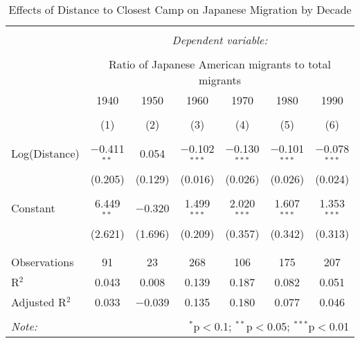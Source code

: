 
\begin{table}[!htbp] \centering 
  \caption{Effects of Distance to Closest Camp on Japanese Migration by Decade} 
  \label{} 
\begin{tabular}{@{\extracolsep{5pt}}lcccccc} 
\\[-1.8ex]\hline 
\hline \\[-1.8ex] 
 & \multicolumn{6}{c}{\textit{Dependent variable:}} \\ 
\cline{2-7} 
\\[-1.8ex] & \multicolumn{6}{c}{Ratio of Japanese American migrants to total migrants} \\ 
 & 1940 & 1950 & 1960 & 1970 & 1980 & 1990 \\ 
\\[-1.8ex] & (1) & (2) & (3) & (4) & (5) & (6)\\ 
\hline \\[-1.8ex] 
 Log(Distance) & $-$0.411$^{**}$ & 0.054 & $-$0.102$^{***}$ & $-$0.130$^{***}$ & $-$0.101$^{***}$ & $-$0.078$^{***}$ \\ 
  & (0.205) & (0.129) & (0.016) & (0.026) & (0.026) & (0.024) \\ 
  & & & & & & \\ 
 Constant & 6.449$^{**}$ & $-$0.320 & 1.499$^{***}$ & 2.020$^{***}$ & 1.607$^{***}$ & 1.353$^{***}$ \\ 
  & (2.621) & (1.696) & (0.209) & (0.357) & (0.342) & (0.313) \\ 
  & & & & & & \\ 
\hline \\[-1.8ex] 
Observations & 91 & 23 & 268 & 106 & 175 & 207 \\ 
R$^{2}$ & 0.043 & 0.008 & 0.139 & 0.187 & 0.082 & 0.051 \\ 
Adjusted R$^{2}$ & 0.033 & $-$0.039 & 0.135 & 0.180 & 0.077 & 0.046 \\ 
\hline 
\hline \\[-1.8ex] 
\textit{Note:}  & \multicolumn{6}{r}{$^{*}$p$<$0.1; $^{**}$p$<$0.05; $^{***}$p$<$0.01} \\ 
\end{tabular} 
\end{table} 
